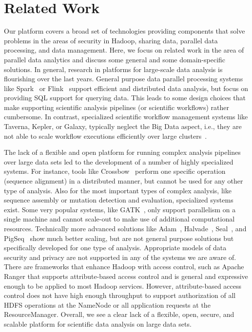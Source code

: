 \section{Related Work}

Our platform covers a broad set of technologies providing components that solve problems in the areas of security in Hadoop, sharing data, parallel data processing, and data management. Here, we focus on related work in the area of parallel data analytics and discuss some general and some domain-specific solutions. In general, research in platforms for large-scale data analysis is flourishing over the last years. General purpose data parallel processing systems like Spark~\cite{Zaharia2010} or Flink~\cite{flink15} support efficient and distributed data analysis, but focus on providing SQL support for querying data. This leads to some design choices that make supporting scientific analysis pipelines (or scientific workflows) rather cumbersome. In contrast, specialized scientific workflow management systems like Taverna, Kepler, or Galaxy, typically neglect the Big Data aspect, i.e., they are not able to scale workflow executions efficiently over large clusters~\cite{Bux2013}. 

The lack of a flexible and open platform for running complex analysis pipelines over large data sets led to the development of a number of highly specialized systems. For instance, tools like Crossbow~\cite{Langmead2009b} perform one specific operation (sequence alignment) in a distributed manner, but cannot be used for any other type of analysis. Also for the most important types of complex analysis, like sequence assembly or mutation detection and evaluation, specialized systems exist. Some very popular systems, like GATK~\cite{McKenna2010}, only support parallelism on a single machine and cannot scale-out to make use of additional computational resources. Technically more advanced solutions like Adam~\cite{adam15}, Halvade~\cite{halvade15}, Seal~\cite{seal11}, and PigSeq~\cite{seqpig14} show much better scaling, but are not general purpose solutions but specifically developed for one type of analysis. Appropriate models of data security and privacy are not supported in any of the systems we are aware of. There are frameworks that enhance Hadoop with access control, such as Apache Ranger that supports attribute-based access control and is general and expressive enough to be applied to most Hadoop services. However, attribute-based access control does not have high enough throughput to support authorization of all HDFS operations at the NameNode or all application requests at the ResourceManager. Overall, we see a clear lack of a flexible, open, secure, and scalable platform for scientific data analysis on large data sets.
